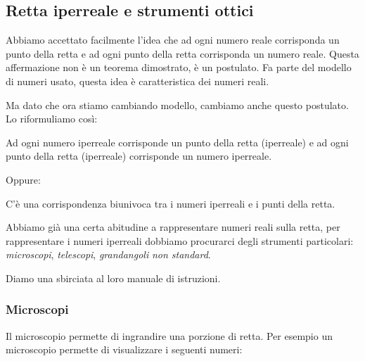 \subsection{Retta iperreale e strumenti ottici}
\label{subsec:insnum_retta}

Abbiamo accettato facilmente l'idea che 
ad ogni numero reale corrisponda un punto della retta e ad ogni 
punto della retta corrisponda un numero reale. 
Questa affermazione non è un teorema dimostrato, è un postulato. 
Fa parte del modello di numeri usato, questa idea è caratteristica dei 
numeri reali. 

Ma dato che ora stiamo cambiando modello, cambiamo anche questo postulato. 
Lo riformuliamo così:

\begin{postulato}
Ad ogni numero iperreale corrisponde un punto della retta (iperreale) e ad 
ogni punto della retta (iperreale) corrisponde un numero iperreale.
\end{postulato}

Oppure:

\begin{postulato}
C'è una corrispondenza biunivoca tra i numeri iperreali e 
i punti della retta.
\end{postulato}

Abbiamo già una certa abitudine a rappresentare numeri reali sulla retta, 
per rappresentare i numeri iperreali dobbiamo procurarci degli strumenti 
particolari: \emph{microscopi}, \emph{telescopi}, \emph{grandangoli} 
\emph{non standard}.

Diamo una sbirciata al loro manuale di istruzioni.

\newpage %

\subsubsection{Microscopi}
\label{subsec:insnum_microscopio}

Il microscopio permette di ingrandire una porzione di retta. 
Per esempio un microscopio permette di visualizzare i seguenti numeri:

